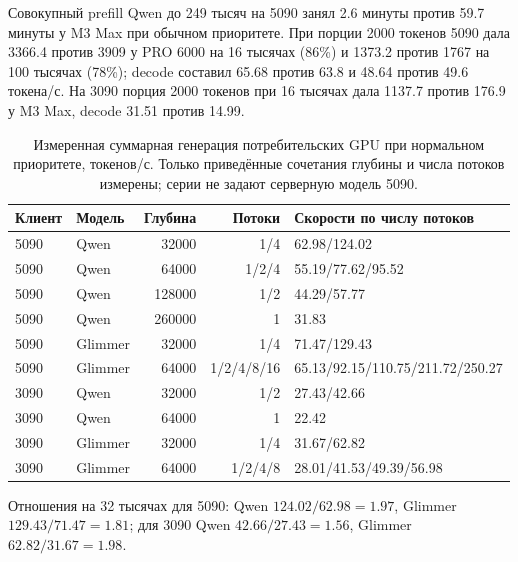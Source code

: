 Совокупный prefill Qwen до 249 тысяч на 5090 занял 2.6 минуты против 59.7 минуты у M3 Max при обычном приоритете.
При порции 2000 токенов 5090 дала 3366.4 против 3909 у PRO 6000 на 16 тысячах (86\%) и 1373.2 против 1767
на 100 тысячах (78\%); decode составил 65.68 против 63.8 и 48.64 против 49.6 токена/с.
На 3090 порция 2000 токенов при 16 тысячах дала 1137.7 против 176.9 у M3 Max, decode 31.51 против 14.99.

\begin{table}[t]
\centering
\caption{Измеренная суммарная генерация потребительских GPU при нормальном приоритете, токенов/с.
Только приведённые сочетания глубины и числа потоков измерены; серии не задают серверную модель 5090.}
\label{tab:consumer-parallel}
\footnotesize
\begin{tabular}{llrrl}
\toprule
Клиент & Модель & Глубина & Потоки & Скорости по числу потоков \\
\midrule
5090 & Qwen & 32000 & 1/4 & 62.98/124.02 \\
5090 & Qwen & 64000 & 1/2/4 & 55.19/77.62/95.52 \\
5090 & Qwen & 128000 & 1/2 & 44.29/57.77 \\
5090 & Qwen & 260000 & 1 & 31.83 \\
5090 & Glimmer & 32000 & 1/4 & 71.47/129.43 \\
5090 & Glimmer & 64000 & 1/2/4/8/16 & 65.13/92.15/110.75/211.72/250.27 \\
3090 & Qwen & 32000 & 1/2 & 27.43/42.66 \\
3090 & Qwen & 64000 & 1 & 22.42 \\
3090 & Glimmer & 32000 & 1/4 & 31.67/62.82 \\
3090 & Glimmer & 64000 & 1/2/4/8 & 28.01/41.53/49.39/56.98 \\
\bottomrule
\end{tabular}
\end{table}

Отношения на 32 тысячах для 5090: Qwen $124.02/62.98=1.97$, Glimmer $129.43/71.47=1.81$;
для 3090 Qwen $42.66/27.43=1.56$, Glimmer $62.82/31.67=1.98$.

